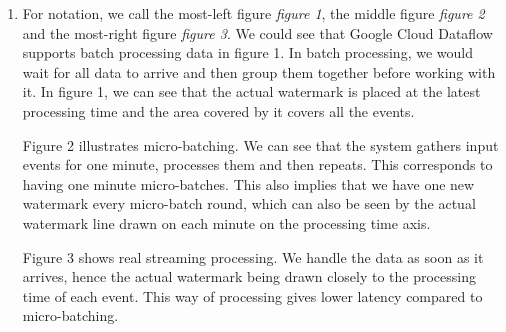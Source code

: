 \documentclass[12pt]{article}
\begin{document}
\begin{enumerate}
    \item For notation, we call the most-left figure \textit{figure 1}, the middle figure \textit{figure 2} and the most-right figure \textit{figure 3}. We could see that Google Cloud Dataflow supports batch processing data in figure 1. In batch processing, we would wait for all data to arrive and then group them together before working with it. In figure 1, we can see that the actual watermark is placed at the latest processing time and the area covered by it covers all the events.
    \par
    Figure 2 illustrates micro-batching. We can see that the system gathers input events for one minute, processes them and then repeats. This corresponds to having one minute micro-batches. This also implies that we have one new watermark every micro-batch round, which can also be seen by the actual watermark line drawn on each minute on the processing time axis.
    \par
    Figure 3 shows real streaming processing. We handle the data as soon as it arrives, hence the actual watermark being drawn closely to the processing time of each event. This way of processing gives lower latency compared to micro-batching.

\end{enumerate}
\end{document}
